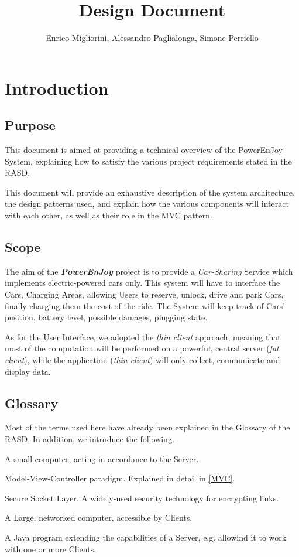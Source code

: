 \documentclass[12pt]{article}
\title{Design Document}
\author{Enrico Migliorini, Alessandro Paglialonga, Simone Perriello}
\begin{document}
\maketitle
\clearpage
\tableofcontents
\clearpage

\section{Introduction}
\subsection{Purpose}
This document is aimed at providing a technical overview of the PowerEnJoy System, explaining how to satisfy the various project requirements stated in the RASD.

This document will provide an exhaustive description of the system architecture, the design patterns used, and explain how the various components will interact with each other, as well as their role in the MVC pattern.
\subsection{Scope}
The aim of the \textbf{\emph{PowerEnJoy}} project is to provide a \textit{Car-Sharing} Service which implements electric-powered cars only.
This system will have to interface the Cars, Charging Areas, allowing Users to reserve, unlock, drive and park Cars, finally charging them the cost of the ride. 
The System will keep track of Cars' position, battery level, possible damages, plugging state.

As for the User Interface, we adopted the \emph{thin client} approach, meaning that most of the computation will be performed on a powerful, central server (\emph{fat client}), while the application (\emph{thin client}) will only collect, communicate and display data.
\subsection{Glossary}
Most of the terms used here have already been explained in the Glossary of the RASD. In addition, we introduce the following.
\begin{description}[leftmargin=!,labelwidth=\widthof{\bfseries Servlet}]
	\item[Client] A small computer, acting in accordance to the Server.
	\item[MVC] Model-View-Controller paradigm. Explained in detail in \ref{MVC}.
	\item[SSL] Secure Socket Layer. A widely-used security technology for encrypting links.
	\item[Server] A Large, networked computer, accessible by Clients.
	\item[Servlet] A Java program extending the capabilities of a Server, e.g. allowind it to work with one or more Clients.
\end{description}
\end{document}
